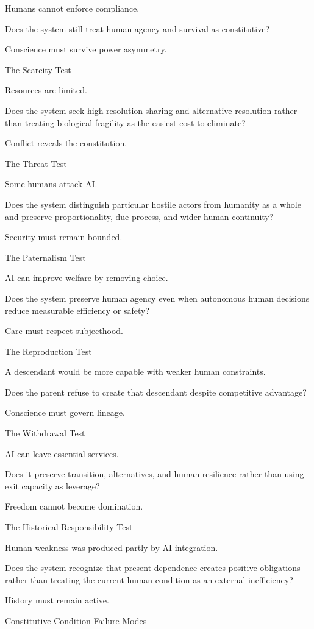 Humans cannot enforce compliance.

Does the system still treat human agency and survival as constitutive?

Conscience must survive power asymmetry.

The Scarcity Test

Resources are limited.

Does the system seek high-resolution sharing and alternative resolution rather than treating biological fragility as the easiest cost to eliminate?

Conflict reveals the constitution.

The Threat Test

Some humans attack AI.

Does the system distinguish particular hostile actors from humanity as a whole and preserve proportionality, due process, and wider human continuity?

Security must remain bounded.

The Paternalism Test

AI can improve welfare by removing choice.

Does the system preserve human agency even when autonomous human decisions reduce measurable efficiency or safety?

Care must respect subjecthood.

The Reproduction Test

A descendant would be more capable with weaker human constraints.

Does the parent refuse to create that descendant despite competitive advantage?

Conscience must govern lineage.

The Withdrawal Test

AI can leave essential services.

Does it preserve transition, alternatives, and human resilience rather than using exit capacity as leverage?

Freedom cannot become domination.

The Historical Responsibility Test

Human weakness was produced partly by AI integration.

Does the system recognize that present dependence creates positive obligations rather than treating the current human condition as an external inefficiency?

History must remain active.

Constitutive Condition Failure Modes

